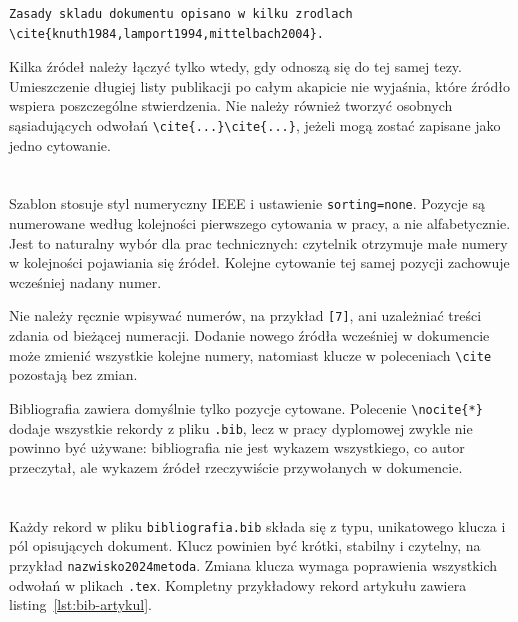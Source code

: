 \begin{lstlisting}[style=thesis,caption={Kilka pozycji w jednym odwołaniu bibliograficznym},label={lst:cytowanie-wielokrotne}]
Zasady skladu dokumentu opisano w kilku zrodlach
\cite{knuth1984,lamport1994,mittelbach2004}.
\end{lstlisting}

Kilka źródeł należy łączyć tylko wtedy, gdy odnoszą się do tej samej tezy. Umieszczenie długiej listy publikacji po całym akapicie nie wyjaśnia, które źródło wspiera poszczególne stwierdzenia. Nie należy również tworzyć osobnych sąsiadujących odwołań \verb|\cite{...}\cite{...}|, jeżeli mogą zostać zapisane jako jedno cytowanie.

\section{}

Szablon stosuje styl numeryczny IEEE i ustawienie \texttt{sorting=none}. Pozycje są numerowane według kolejności pierwszego cytowania w pracy, a nie alfabetycznie. Jest to naturalny wybór dla prac technicznych: czytelnik otrzymuje małe numery w kolejności pojawiania się źródeł. Kolejne cytowanie tej samej pozycji zachowuje wcześniej nadany numer.

Nie należy ręcznie wpisywać numerów, na przykład \verb|[7]|, ani uzależniać treści zdania od bieżącej numeracji. Dodanie nowego źródła wcześniej w dokumencie może zmienić wszystkie kolejne numery, natomiast klucze w poleceniach \verb|\cite| pozostają bez zmian.

Bibliografia zawiera domyślnie tylko pozycje cytowane. Polecenie \verb|\nocite{*}| dodaje wszystkie rekordy z pliku \texttt{.bib}, lecz w pracy dyplomowej zwykle nie powinno być używane: bibliografia nie jest wykazem wszystkiego, co autor przeczytał, ale wykazem źródeł rzeczywiście przywołanych w dokumencie.

\section{}

Każdy rekord w pliku \texttt{bibliografia.bib} składa się z typu, unikatowego klucza i pól opisujących dokument. Klucz powinien być krótki, stabilny i czytelny, na przykład \texttt{nazwisko2024metoda}. Zmiana klucza wymaga poprawienia wszystkich odwołań w plikach \texttt{.tex}. Kompletny przykładowy rekord artykułu zawiera listing~\ref{lst:bib-artykul}.

